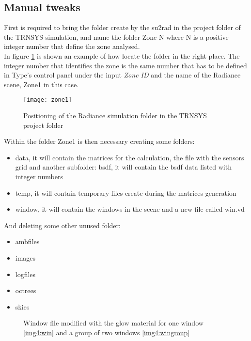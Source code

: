 \subsection{Manual tweaks}
First is required to bring the folder create by the su2rad in the project folder of the TRNSYS simulation, and name the folder Zone{\color{red} N} where {\color{red} N} is a positive integer number that define the zone analysed.\\
In figure \ref{img4:zone1} is shown an example of how locate the folder in the right place. The integer number that identifies the zone is the same number that has to be defined in Type's control panel under the input \textit{Zone ID} and the name of the Radiance scene, Zone1 in this case.
\begin{figure}[h]
\centering
\texttt{[image: zone1]}
\caption{\label{img4:zone1} Positioning of the Radiance simulation folder in the TRNSYS project folder}
\end{figure}

Within the folder Zone1 is then necessary creating some folders: 
\begin{itemize}
\renewcommand{\labelitemi}{\tiny$\blacksquare$}
\item {\color{blue} data}, it will contain the matrices for the calculation, the file with the sensors grid and another subfolder:
\subitem{\tiny$\blacksquare$} {\color{blue} bsdf}, it will contain the bsdf data listed with integer numbers
\item {\color{blue} temp}, it will contain temporary files create during the matrices generation
\item {\color{blue} window}, it will contain the windows in the scene and a new file called win.vd
\end{itemize}

And deleting some other unused folder:
\begin{itemize}
\renewcommand{\labelitemi}{\tiny$\blacksquare$}
\item ambfiles
\item images
\item logfiles
\item octrees
\item skies
\end{itemize}

\begin{figure}[h] 
  \caption{\label{img4:winglow} Window file modified with the glow material for one window \ref{img4:win} and a group of two windows \ref{img4:wingroup}}
\end{figure}

